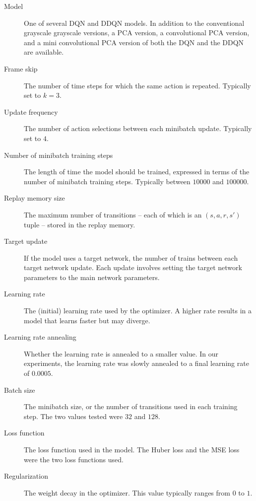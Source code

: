 \documentclass[11pt, twocolumn]{article}
\begin{document}
\begin{description}
    \item[Model] One of several DQN and DDQN models. In addition to the conventional grayscale grayscale versions, a PCA version, a convolutional PCA version, and a mini convolutional PCA version of both the DQN and the DDQN are available.
    
    \item[Frame skip] The number of time steps for which the same action is repeated. Typically set to $k = 3$.
    
    \item[Update frequency] The number of action selections between each minibatch update. Typically set to $4$.
    
    \item[Number of minibatch training steps] The length of time the model should be trained, expressed in terms of the number of minibatch training steps. Typically between $10000$ and $100000$.
    
    \item[Replay memory size] The maximum number of transitions -- each of which is an $(s, a, r, s')$ tuple -- stored in the replay memory.
    
    \item[Target update] If the model uses a target network, the number of trains between each target network update. Each update involves setting the target network parameters to the main network parameters.
    
    \item[Learning rate] The (initial) learning rate used by the optimizer. A higher rate results in a model that learns faster but may diverge.
    
    \item[Learning rate annealing] Whether the learning rate is annealed to a smaller value. In our experiments, the learning rate was slowly annealed to a final learning rate of $0.0005$.
    
    \item[Batch size] The minibatch size, or the number of transitions used in each training step. The two values tested were $32$ and $128$.
    
    \item[Loss function] The loss function used in the model. The Huber loss and the MSE loss were the two loss functions used.
    
    \item[Regularization] The weight decay in the optimizer. This value typically ranges from $0$ to $1$.
\end{description}
\end{document}

